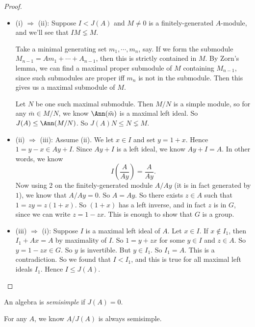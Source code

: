 \documentclass[a4paper]{article}
\begin{document}
\begin{proof}\leavevmode
  \begin{itemize}
    \item (i) $\Rightarrow$ (ii): Suppose $I < J(A)$ and $M \not= 0$ is a finitely-generated $A$-module, and we'll see that $IM \lneq M$.

      Take a minimal generating set $m_1, \cdots, m_n$, say. If we form the submodule $M_{n - 1} = Am_1 + \cdots + A_{n - 1}$, then this is strictly contained in $M$. By Zorn's lemma, we can find a maximal proper submodule of $M$ containing $M_{n - 1}$, since such submodules are proper iff $m_n$ is not in the submodule. Then this gives us a maximal submodule of $M$.

      Let $N$ be one such maximal submodule. Then $M/N$ is a simple module, so for any $\bar{m} \in M/N$, we know $\Ann(\bar{m})$ is a maximal left ideal. So $J(A) \leq \Ann(M/N)$. So $J(A) N \leq N \lneq M$.
    \item (ii) $\Rightarrow$ (iii): Assume (ii). We let $x \in I$ and set $y = 1 + x$. Hence $1 = y - x \in Ay + I$. Since $Ay + I$ is a left ideal, we know $Ay + I = A$. In other words, we know
      \[
        I \left(\frac{A}{Ay}\right) = \frac{A}{Ay}.
      \]
      Now using $2$ on the finitely-generated module $A/Ay$ (it is in fact generated by $1$), we know that $A/Ay = 0$. So $A = Ay$. So there exists $z \in A$ such that $1 = zy = z(1 + x)$. So $(1 + x)$ has a left inverse, and in fact $z$ is in $G$, since we can write $z = 1 - zx$. This is enough to show that $G$ is a group.
    \item (iii) $\Rightarrow$ (i): Suppose $I$ is a maximal left ideal of $A$. Let $x \in I$. If $x \not \in I_1$, then $I_1 + Ax = A$ by maximality of $I$. So $1 = y + zx$ for some $y \in I$ and $z \in A$. So $y = 1 - zx \in G$. So $y$ is invertible. But $y \in I_1$. So $I_1 = A$. This is a contradiction. So we found that $I < I_1$, and this is true for all maximal left ideals $I_1$. Hence $I \leq J(A)$.
  \end{itemize}
\end{proof}

\begin{defi}
  An algebra is \emph{semisimple} if $J(A) = 0$.
\end{defi}

\begin{eg}
  For any $A$, we know $A/J(A)$ is always semisimple.
\end{eg}
\printindex
\end{document}

